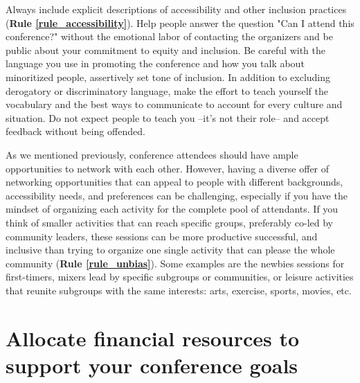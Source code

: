 \documentclass[10pt,letterpaper]{article}
\begin{document}
Always include explicit descriptions of accessibility and other inclusion practices (\textbf{Rule \ref{rule_accessibility}}). Help people answer the question "Can I attend this conference?" without the emotional labor of contacting the organizers and be public about your commitment to equity and inclusion.%
Be careful with the language you use in promoting the conference and how you talk about minoritized people, assertively set tone of inclusion. In addition to excluding derogatory or discriminatory language, make the effort to teach yourself the vocabulary and the best ways to communicate to account for every culture and situation. Do not expect people to teach you --it's not their role-- and accept feedback without being offended.

As we mentioned previously, conference attendees should have ample opportunities to network with each other. However, having a diverse offer of networking opportunities that can appeal to people with different backgrounds, accessibility needs, and preferences can be challenging, especially if you have the mindset of organizing each activity for the complete pool of attendants. If you think of smaller activities that can reach specific groups, preferably co-led by community leaders, these sessions can be more productive successful, and inclusive than trying to organize one single activity that can please the whole community (\textbf{Rule \ref{rule_unbias}}). Some examples are the newbies sessions for first-timers, mixers lead by specific subgroups or communities, or leisure activities that reunite subgroups with the same interests: arts, exercise, sports, movies, etc.


\section{Allocate financial resources to support your conference goals}
\label{rule_financial}
\end{document}
